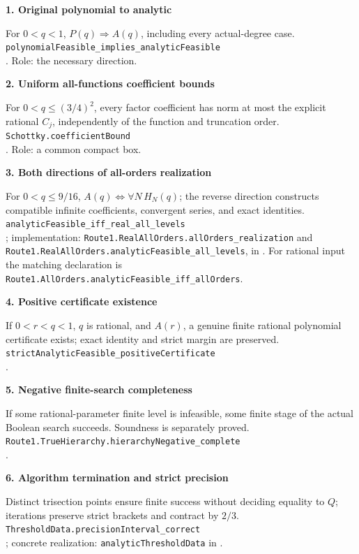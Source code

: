 \documentclass[10pt,a4paper]{article}
\newcommand{\decl}[1]{{\small\texttt{#1}}}
\newcommand{\itemhead}[2]{\par\medskip\textbf{#1. #2}\par}
\begin{document}
\itemhead{1}{Original polynomial to analytic}
For $0<q<1$, $P(q)\Rightarrow A(q)$, including every actual-degree case.\\
\decl{polynomialFeasible\_implies\_analyticFeasible}\\
. Role: the necessary direction.

\itemhead{2}{Uniform all-functions coefficient bounds}
For $0<q\le(3/4)^2$, every factor coefficient has norm at most the explicit
rational $C_j$, independently of the function and truncation order.\\
\decl{Schottky.coefficientBound}\\
. Role: a common compact box.

\itemhead{3}{Both directions of all-orders realization}
For $0<q\le9/16$, $A(q)\iff\forall N\,H_N(q)$; the reverse direction
constructs compatible infinite coefficients, convergent series, and exact identities.\\
\decl{analyticFeasible\_iff\_real\_all\_levels}\\
; implementation:
\decl{Route1.RealAllOrders.allOrders\_realization} and
\decl{Route1.RealAllOrders.analyticFeasible\_all\_levels}, in
.
For rational input the matching declaration is
\decl{Route1.AllOrders.analyticFeasible\_iff\_allOrders}.

\itemhead{4}{Positive certificate existence}
If $0<r<q<1$, $q$ is rational, and $A(r)$, a genuine finite rational
polynomial certificate exists; exact identity and strict margin are preserved.\\
\decl{strictAnalyticFeasible\_positiveCertificate}\\
.

\itemhead{5}{Negative finite-search completeness}
If some rational-parameter finite level is infeasible, some finite stage
of the actual Boolean search succeeds. Soundness is separately proved.\\
\decl{Route1.TrueHierarchy.hierarchyNegative\_complete}\\
.

\itemhead{6}{Algorithm termination and strict precision}
Distinct trisection points ensure finite success without deciding equality
to $Q$; iterations preserve strict brackets and contract by $2/3$.\\
\decl{ThresholdData.precisionInterval\_correct}\\
; concrete realization:
\decl{analyticThresholdData} in .
\end{document}
